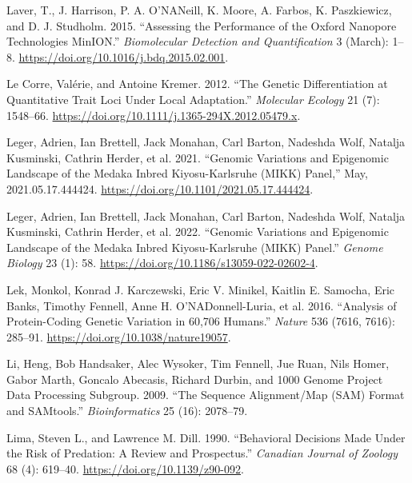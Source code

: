 \documentclass[
]{book}
\newlength{\cslhangindent}
\newlength{\cslentryspacingunit} %
\newenvironment{CSLReferences}[2] %
 {%
  \setlength{\parindent}{0pt}
  \ifodd #1
  \let\oldpar\par
  \def\par{\hangindent=\cslhangindent\oldpar}
  \fi
  \setlength{\parskip}{#2\cslentryspacingunit}
 }%
 {}
\begin{document}
\begin{CSLReferences}{1}{0}
\leavevmode{}%
Laver, T., J. Harrison, P. A. O'NANeill, K. Moore, A. Farbos, K. Paszkiewicz, and D. J. Studholm. 2015. {``Assessing the Performance of the {Oxford Nanopore Technologies MinION}.''} \emph{Biomolecular Detection and Quantification} 3 (March): 1--8. \url{https://doi.org/10.1016/j.bdq.2015.02.001}.

\leavevmode{}%
Le Corre, Valérie, and Antoine Kremer. 2012. {``The Genetic Differentiation at Quantitative Trait Loci Under Local Adaptation.''} \emph{Molecular Ecology} 21 (7): 1548--66. \url{https://doi.org/10.1111/j.1365-294X.2012.05479.x}.

\leavevmode{}%
Leger, Adrien, Ian Brettell, Jack Monahan, Carl Barton, Nadeshda Wolf, Natalja Kusminski, Cathrin Herder, et al. 2021. {``Genomic Variations and Epigenomic Landscape of the {Medaka Inbred Kiyosu-Karlsruhe} ({MIKK}) Panel,''} May, 2021.05.17.444424. \url{https://doi.org/10.1101/2021.05.17.444424}.

\leavevmode{}%
Leger, Adrien, Ian Brettell, Jack Monahan, Carl Barton, Nadeshda Wolf, Natalja Kusminski, Cathrin Herder, et al. 2022. {``Genomic Variations and Epigenomic Landscape of the {Medaka Inbred Kiyosu-Karlsruhe} ({MIKK}) Panel.''} \emph{Genome Biology} 23 (1): 58. \url{https://doi.org/10.1186/s13059-022-02602-4}.

\leavevmode{}%
Lek, Monkol, Konrad J. Karczewski, Eric V. Minikel, Kaitlin E. Samocha, Eric Banks, Timothy Fennell, Anne H. O'NADonnell-Luria, et al. 2016. {``Analysis of Protein-Coding Genetic Variation in 60,706 Humans.''} \emph{Nature} 536 (7616, 7616): 285--91. \url{https://doi.org/10.1038/nature19057}.

\leavevmode{}%
Li, Heng, Bob Handsaker, Alec Wysoker, Tim Fennell, Jue Ruan, Nils Homer, Gabor Marth, Goncalo Abecasis, Richard Durbin, and 1000 Genome Project Data Processing Subgroup. 2009. {``The {Sequence} Alignment/Map ({SAM}) Format and {SAMtools}.''} \emph{Bioinformatics} 25 (16): 2078--79.

\leavevmode{}%
Lima, Steven L., and Lawrence M. Dill. 1990. {``Behavioral Decisions Made Under the Risk of Predation: A Review and Prospectus.''} \emph{Canadian Journal of Zoology} 68 (4): 619--40. \url{https://doi.org/10.1139/z90-092}.


\end{CSLReferences}
\end{document}
